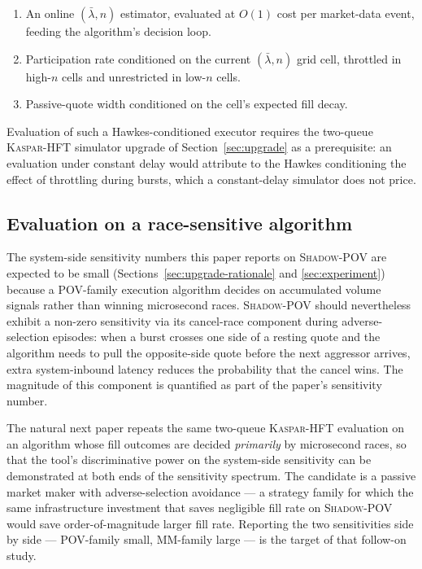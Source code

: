 \documentclass[11pt]{article}
\newcommand{\kasparhft}{\textsc{Kaspar-HFT}}
\newcommand{\shadowpov}{\textsc{Shadow-POV}}
\begin{document}
\begin{enumerate}
    \item An online $(\bar\lambda, n)$ estimator, evaluated at $O(1)$ cost per market-data event, feeding the algorithm's decision loop.
    \item Participation rate conditioned on the current $(\bar\lambda, n)$ grid cell, throttled in high-$n$ cells and unrestricted in low-$n$ cells.
    \item Passive-quote width conditioned on the cell's expected fill decay.
\end{enumerate}

Evaluation of such a Hawkes-conditioned executor requires the two-queue \kasparhft{} simulator upgrade of Section~\ref{sec:upgrade} as a prerequisite: an evaluation under constant delay would attribute to the Hawkes conditioning the effect of throttling during bursts, which a constant-delay simulator does not price.

\subsection{Evaluation on a race-sensitive algorithm}
\label{sec:future-race-algo}

The system-side sensitivity numbers this paper reports on \shadowpov{} are expected to be small (Sections~\ref{sec:upgrade-rationale} and \ref{sec:experiment}) because a POV-family execution algorithm decides on accumulated volume signals rather than winning microsecond races. \shadowpov{} should nevertheless exhibit a non-zero sensitivity via its cancel-race component during adverse-selection episodes: when a burst crosses one side of a resting quote and the algorithm needs to pull the opposite-side quote before the next aggressor arrives, extra system-inbound latency reduces the probability that the cancel wins. The magnitude of this component is quantified as part of the paper's sensitivity number.

The natural next paper repeats the same two-queue \kasparhft{} evaluation on an algorithm whose fill outcomes are decided \emph{primarily} by microsecond races, so that the tool's discriminative power on the system-side sensitivity can be demonstrated at both ends of the sensitivity spectrum. The candidate is a passive market maker with adverse-selection avoidance --- a strategy family for which the same infrastructure investment that saves negligible fill rate on \shadowpov{} would save order-of-magnitude larger fill rate. Reporting the two sensitivities side by side --- POV-family small, MM-family large --- is the target of that follow-on study.
\end{document}
